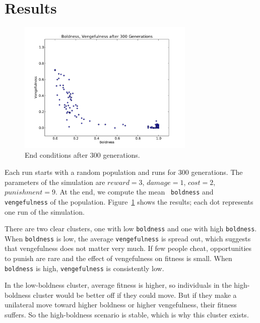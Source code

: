 \documentclass[10pt]{book}
\begin{document}
\section{Results}

\begin{figure}
  \begin{center}
    \includegraphics[width=0.75\textwidth]{figs/replicateNorms_stableBV_06.pdf}
  \end{center}
  \caption{End conditions after 300 generations.\label{fig.normsRep}}
\end{figure}

Each run starts with a random population and runs for 300 generations.
The parameters of the simulation are $reward = 3$, $damage = 1$, $cost
= 2$, $punishment = 9$.  At the end, we compute the mean {\tt
  boldness} and {\tt vengefulness} of the population.
Figure~\ref{fig.normsRep} shows the results; each dot represents one
run of the simulation.

There are two clear clusters, one with low \texttt{boldness} and one
with high \texttt{boldness}.  When \texttt{boldness} is low, the
average \texttt{vengefulness} is spread out, which suggests that
vengefulness does not matter very much.  If few people cheat,
opportunities to punish are rare and the effect of vengefulness on
fitness is small.  When \texttt{boldness} is high,
\texttt{vengefulness} is consistently low.

In the low-boldness cluster, average fitness is higher, so
individuals in the high-boldness cluster would be better off if they
could move.  But if they make a unilateral move toward higher
boldness or higher vengefulness, their fitness suffers.  So the
high-boldness scenario is stable, which is why this cluster exists.

\end{document}
